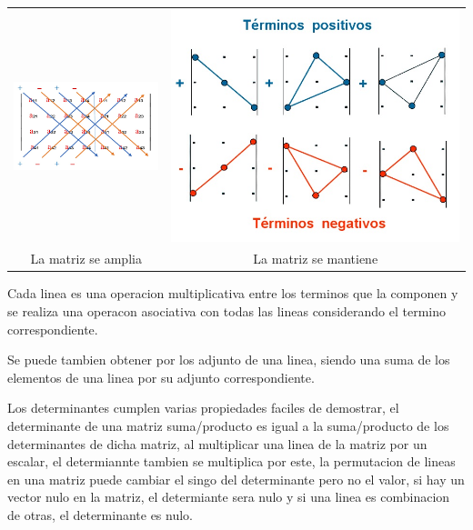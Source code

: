 \documentclass[11pt,a4paper]{article}
\begin{document}
\begin{enumerate}
\begin{tabular}{c c}
\includegraphics[scale=0.8]{d1}&\includegraphics[scale=0.4]{d2}\\
La matriz se amplia&La matriz se mantiene\\
\end{tabular}

Cada linea es una operacion multiplicativa entre los terminos que la componen y se realiza una operacon asociativa con todas las lineas considerando el termino correspondiente.

 Se puede tambien obtener por los adjunto de una linea, siendo una suma de los elementos de una linea por su adjunto correspondiente.
 
 Los determinantes cumplen varias propiedades faciles de demostrar, el determinante de una matriz suma/producto es igual a la suma/producto de los determinantes de dicha matriz, al multiplicar una linea de la matriz por un escalar, el determiannte tambien se multiplica por este, la permutacion de lineas en una matriz puede cambiar el singo del determinante pero no el valor, si hay un vector nulo en la matriz, el determiante sera nulo y si una linea es combinacion de otras, el determinante es nulo.
 

\end{enumerate}
\end{document}
